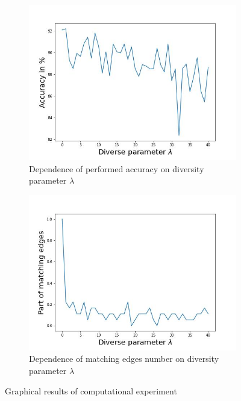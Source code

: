 \documentclass{article}
\begin{document}
\begin{figure}[h]
	\centering
	\begin{subfigure}{.46\textwidth}
        \centering
	    \includegraphics[width=1\linewidth]{fig2}
	  \caption{Dependence of performed accuracy on diversity parameter $\lambda$}
	  \label{fig:graph1}
	\end{subfigure}%
    \hspace{1cm}
	\begin{subfigure}{.46\textwidth}
	  \centering
	  \includegraphics[width=1\linewidth]{fig3}
	  \caption{Dependence of matching edges number on diversity parameter $\lambda$}
	  \label{fig:graph2}
	\end{subfigure}
	\caption{Graphical results of computational experiment}
	\label{fig:graph}
\end{figure}
\end{document}

